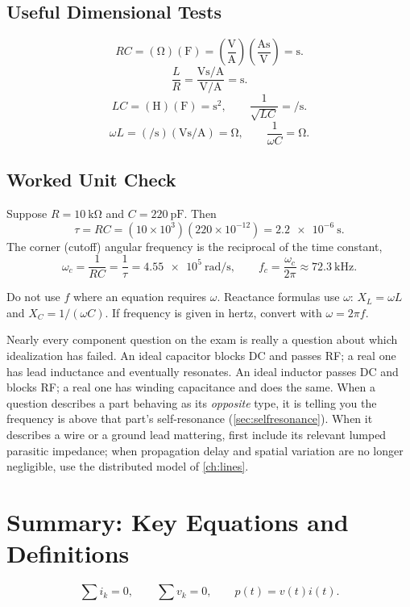 \subsection{Useful Dimensional Tests}
\begin{unitsbox}
\[
RC=(\si{\ohm})(\si{\farad})
=\left(\frac{\si{\volt}}{\si{\ampere}}\right)
\left(\frac{\si{\ampere\second}}{\si{\volt}}\right)
=\si{\second}.
\]
\[
\frac{L}{R}
=\frac{\si{\volt\second\per\ampere}}{\si{\volt\per\ampere}}
=\si{\second}.
\]
\[
LC=(\si{\henry})(\si{\farad})=\si{\second\squared},
\qquad
\frac{1}{\sqrt{LC}}=\si{\per\second}.
\]
\[
\omega L=(\si{\per\second})(\si{\volt\second\per\ampere})
=\si{\ohm},
\qquad
\frac{1}{\omega C}=\si{\ohm}.
\]
\end{unitsbox}

\subsection{Worked Unit Check}
Suppose \(R=\SI{10}{\kilo\ohm}\) and \(C=\SI{220}{\pico\farad}\). Then
\[
\tau=RC=(10\times10^3)(220\times10^{-12})=\SI{2.2e-6}{\second}.
\]
The corner (cutoff) angular frequency is the reciprocal of the time constant,
\[
\omega_c=\frac{1}{RC}=\frac{1}{\tau}=\SI{4.55e5}{\radian\per\second},
\qquad
f_c=\frac{\omega_c}{2\pi}\approx \SI{72.3}{\kilo\hertz}.
\]

\begin{mistakebox}
Do not use \(f\) where an equation requires \(\omega\). Reactance formulas use
\(\omega\): \(X_L=\omega L\) and \(X_C=1/(\omega C)\). If frequency is given in
hertz, convert with \(\omega=2\pi f\).
\end{mistakebox}

\begin{exambox}
Nearly every component question on the exam is really a question about which
idealization has failed. An ideal capacitor blocks DC and passes RF; a real one has
lead inductance and eventually resonates. An ideal inductor passes DC and blocks
RF; a real one has winding capacitance and does the same. When a question describes
a part behaving as its \emph{opposite} type, it is telling you the frequency is
above that part's self-resonance (\cref{sec:selfresonance}). When it describes a
wire or a ground lead mattering, first include its relevant lumped parasitic
impedance; when propagation delay and spatial variation are no longer negligible,
use the distributed model of \cref{ch:lines}.
\end{exambox}

\section{Summary: Key Equations and Definitions}
\[
\sum i_k=0,\qquad \sum v_k=0,\qquad
p(t)=v(t)i(t).
\]

